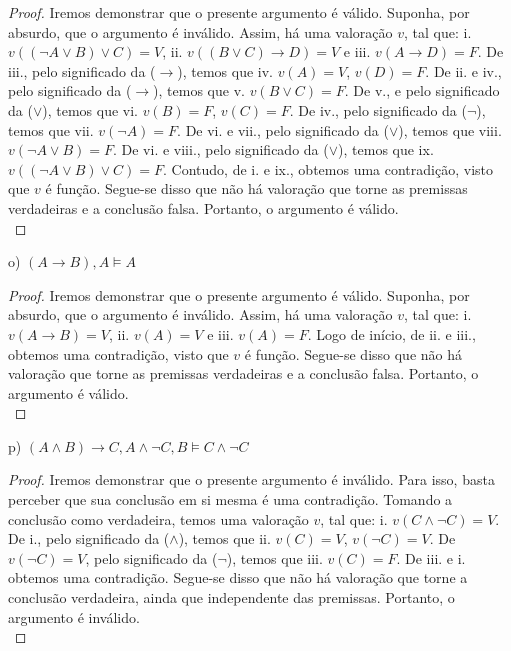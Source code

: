 \documentclass[12pt]{exam}
\begin{document}
\begin{proof}
Iremos demonstrar que o presente argumento é válido. Suponha, por absurdo, que o argumento é inválido. Assim, há uma valoração $v$, tal que:
i. $v((\neg A \lor B)\lor C)=V$,
ii. $v((B\lor C)\rightarrow D)=V$ e
iii. $v(A\rightarrow D)=F$. De iii., pelo significado da ($\rightarrow$), temos que iv. $v(A)=V$, $v(D)=F$. De ii. e iv., pelo significado da ($\rightarrow$), temos que v. $v(B\lor C)=F$. De v., e pelo significado da ($\lor$), temos que vi. $v(B)=F$, $v(C)=F$. De iv., pelo significado da ($\neg$), temos que vii. $v(\neg A)=F$. De vi. e vii., pelo significado da ($\lor$), temos que viii. $v(\neg A \lor B)=F$. De vi. e viii., pelo significado da ($\lor$), temos que ix. $v((\neg A\lor B)\lor C)=F$. Contudo, de i. e ix., obtemos uma contradição, visto que $v$ é função. Segue-se disso que não há valoração que torne as premissas verdadeiras e a conclusão falsa. Portanto, o argumento é válido.\\
\end{proof}

\bigskip

o) $(A\rightarrow B), A\vDash A$

\begin{proof}
Iremos demonstrar que o presente argumento é válido. Suponha, por absurdo, que o argumento é inválido. Assim, há uma valoração $v$, tal que:
i. $v(A\rightarrow B)=V$, 
ii. $v(A)=V$ e 
iii. $v(A)=F$. Logo de início, de ii. e iii., obtemos uma contradição, visto que $v$ é função. Segue-se disso que não há valoração que torne as premissas verdadeiras e a conclusão falsa. Portanto, o argumento é válido.\\
\end{proof}

\bigskip

p) $(A\land B)\rightarrow C, A\land \neg C, B\vDash C\land \neg C$

\begin{proof}
Iremos demonstrar que o presente argumento é inválido. Para isso, basta perceber que sua conclusão em si mesma é uma contradição. Tomando a conclusão como verdadeira, temos uma valoração $v$, tal que: i. $v(C\land \neg C)=V$. De i., pelo significado da ($\land$), temos que ii. $v(C)=V$, $v(\neg C)=V$. De $v(\neg C)=V$, pelo significado da ($\neg$), temos que iii. $v(C)=F$. De iii. e i. obtemos uma contradição. Segue-se disso que não há valoração que torne a conclusão verdadeira, ainda que independente das premissas. Portanto, o argumento é inválido.\\
\end{proof}

\bigskip
\end{document}
